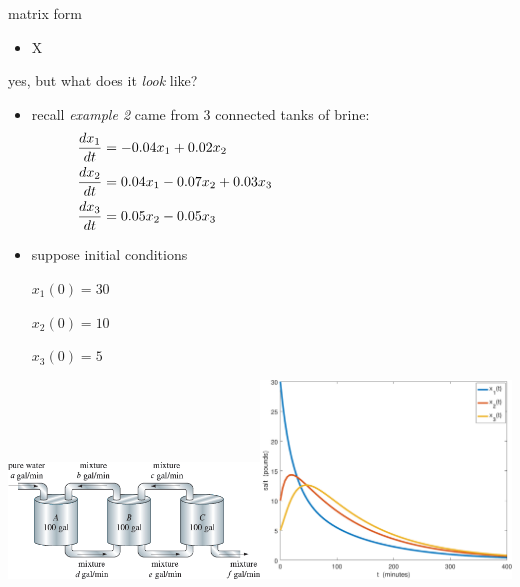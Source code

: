 \documentclass[urlcolor=blue,dvipsnames]{beamer}
\begin{document}
\begin{frame}{matrix form}

\begin{itemize}
\item X
\end{itemize}
\end{frame}


\begin{frame}{yes, but what does it \emph{look} like?}

\begin{itemize}
\item recall \emph{example 2} came from 3 connected tanks of brine:
\small
\begin{align*}
\frac{dx_1}{dt} &= -0.04 x_1 + 0.02 x_2 \hspace{60mm} \\
\frac{dx_2}{dt} &= 0.04 x_1 - 0.07 x_2 + 0.03 x_3 \\
\frac{dx_3}{dt} &= 0.05 x_2 - 0.05 x_3
\end{align*}
\normalsize
\item suppose initial conditions

\small $x_1(0)=30$ 

$x_2(0)=10$

$x_3(0)=5$
\end{itemize}

\vspace{-15mm}
\mbox{\includegraphics[width=0.5\textwidth]{figs/three-tanks}\quad \includegraphics[width=0.5\textwidth]{figs/brines-xvt}}
\end{frame}
\end{document}
